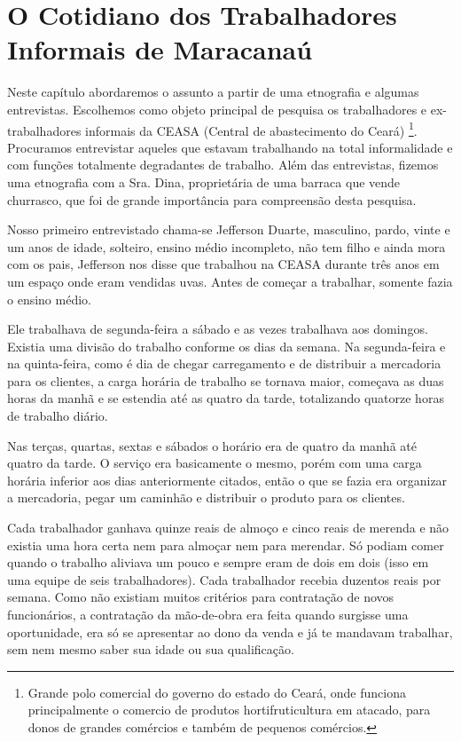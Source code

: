 \chapter{O Cotidiano dos Trabalhadores Informais de Maracanaú}

Neste capítulo abordaremos o assunto a partir de uma etnografia e algumas entrevistas. Escolhemos como objeto principal de pesquisa os trabalhadores e ex-trabalhadores informais da CEASA (Central de abastecimento do Ceará) \footnote{Grande polo comercial do governo do estado do Ceará, onde funciona principalmente o comercio de produtos hortifruticultura em atacado, para donos de grandes comércios e também de pequenos comércios.}. Procuramos entrevistar aqueles que estavam trabalhando na total informalidade e com funções totalmente degradantes de trabalho. Além das entrevistas, fizemos uma etnografia com a Sra. Dina, proprietária de uma barraca que vende churrasco, que foi de grande importância para compreensão desta pesquisa. 

Nosso primeiro entrevistado chama-se Jefferson Duarte, masculino, pardo, vinte e um anos de idade, solteiro, ensino médio incompleto, não tem filho e ainda mora com os pais, Jefferson nos disse que trabalhou na CEASA durante três anos em um espaço onde eram vendidas uvas. Antes de começar a trabalhar, somente fazia o ensino médio. 
 
Ele trabalhava de segunda-feira a sábado e as vezes trabalhava aos domingos. Existia uma divisão do trabalho conforme os dias da semana. Na segunda-feira e na quinta-feira, como é dia de chegar carregamento e de distribuir a mercadoria para os clientes, a carga horária de trabalho se tornava maior, começava as duas horas da manhã e se estendia até as quatro da tarde, totalizando quatorze horas de trabalho diário.
 
Nas terças, quartas, sextas e sábados o horário era de quatro da manhã até quatro da tarde. O serviço era basicamente o mesmo, porém com uma carga horária inferior aos dias anteriormente citados, então o que se fazia era organizar a mercadoria, pegar um caminhão e distribuir o produto para os clientes. %
 
Cada trabalhador ganhava quinze reais de almoço e cinco reais de merenda e não existia uma hora certa nem para almoçar nem para merendar. Só podiam comer quando o trabalho aliviava um pouco e sempre eram de dois em dois (isso em uma equipe de seis trabalhadores). Cada trabalhador recebia duzentos reais por semana. Como não existiam muitos critérios para contratação de novos funcionários, a contratação da mão-de-obra era feita quando surgisse uma oportunidade, era só se apresentar ao dono da venda e já te mandavam trabalhar, sem nem mesmo saber sua idade ou sua qualificação.

